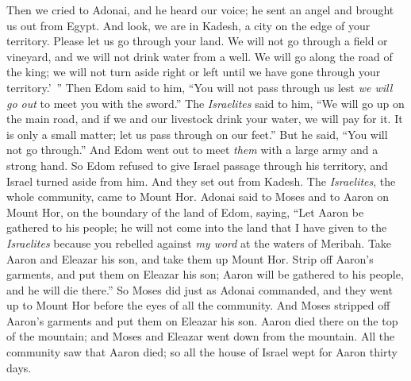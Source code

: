 \begin{biblechapter}
\verse Then we cried to Adonai, and he heard our voice; he sent an angel and brought us out from Egypt. And look, we are in Kadesh, a city on the edge of your territory.
\verse Please let us go through your land. We will not go through a field or vineyard, and we will not drink water from a well. We will go along the road of the king; we will not turn aside right or left until we have gone through your territory.’ ”
\verse Then Edom said to him, “You will not pass through us lest \textit{we will go out} to meet you with the sword.”
\verse The \textit{Israelites} said to him, “We will go up on the main road, and if we and our livestock drink your water, we will pay for it. It is only a small matter; let us pass through on our feet.”
\verse But he said, “You will not go through.” And Edom went out to meet \textit{them} with a large army and a strong hand.
\verse So Edom refused to give Israel passage through his territory, and Israel turned aside from him.
 And they set out from Kadesh. The \textit{Israelites}, the whole community, came to Mount Hor.
\verse Adonai said to Moses and to Aaron on Mount Hor, on the boundary of the land of Edom, saying,
\verse “Let Aaron be gathered to his people; he will not come into the land that I have given to the \textit{Israelites} because you rebelled against \textit{my word} at the waters of Meribah.
\verse Take Aaron and Eleazar his son, and take them up Mount Hor.
\verse Strip off Aaron’s garments, and put them on Eleazar his son; Aaron will be gathered to his people, and he will die there.”
\verse So Moses did just as Adonai commanded, and they went up to Mount Hor before the eyes of all the community.
\verse And Moses stripped off Aaron’s garments and put them on Eleazar his son. Aaron died there on the top of the mountain; and Moses and Eleazar went down from the mountain.
\verse All the community saw that Aaron died; so all the house of Israel wept for Aaron thirty days.
\end{biblechapter}

